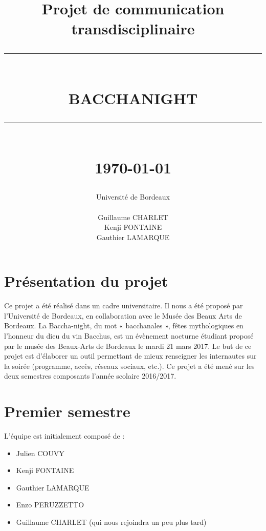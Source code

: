 \documentclass[11pt]{report}
\newcommand{\HRule}[1]{\rule{\linewidth}{#1}}
\renewcommand{\thesection}{\arabic{section}}
\begin{document}
\title
{
	\Large{Projet de communication transdisciplinaire}
	\HRule{2pt} \\ [0.5cm]
	\LARGE \textbf{\uppercase{Bacchanight}}
	\HRule{2pt} \\ [0.5cm]
	\normalsize \today
}

\date{}

\author
{
	\LARGE{Université de Bordeaux} \\
	\\
	Guillaume CHARLET \\
    Kenji FONTAINE \\
    Gauthier LAMARQUE \\
}

\maketitle


\renewcommand{\thesection}{\arabic{section}}

\section{Présentation du projet}

Ce projet a été réalisé dans un cadre universitaire. Il nous a été proposé par
l'Université de Bordeaux, en collaboration avec le Musée des Beaux Arts de Bordeaux.
La Baccha-night, du mot « bacchanales », fêtes mythologiques en l’honneur du
dieu du vin Bacchus, est un évènement nocturne étudiant proposé par le musée
des Beaux-Arts de Bordeaux le mardi 21 mars 2017.
Le but de ce projet est d'élaborer un outil permettant de mieux renseigner
les internautes sur la soirée (programme, accès, réseaux sociaux, etc.).
Ce projet a été mené sur les deux semestres composants l'année scolaire 2016/2017.

\section{Premier semestre}

L'équipe est initialement composé de :
\begin{itemize}
 	\item Julien COUVY
    \item Kenji FONTAINE
    \item Gauthier LAMARQUE
    \item Enzo PERUZZETTO
	\item Guillaume CHARLET (qui nous rejoindra un peu plus tard)
\end{itemize}
\end{document}
